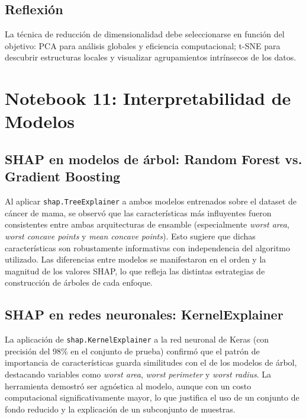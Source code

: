 \documentclass[12pt, a4paper]{article}
\begin{document}
\subsection{Reflexión}

La técnica de reducción de dimensionalidad debe seleccionarse en función del objetivo: PCA para análisis globales y eficiencia computacional; t-SNE para descubrir estructuras locales y visualizar agrupamientos intrínsecos de los datos.

\section{Notebook 11: Interpretabilidad de Modelos}

\subsection{SHAP en modelos de árbol: Random Forest vs. Gradient Boosting}

Al aplicar \texttt{shap.TreeExplainer} a ambos modelos entrenados sobre el dataset de cáncer de mama, se observó que las características más influyentes fueron consistentes entre ambas arquitecturas de ensamble (especialmente \textit{worst area}, \textit{worst concave points} y \textit{mean concave points}). Esto sugiere que dichas características son robustamente informativas con independencia del algoritmo utilizado. Las diferencias entre modelos se manifestaron en el orden y la magnitud de los valores SHAP, lo que refleja las distintas estrategias de construcción de árboles de cada enfoque.

\subsection{SHAP en redes neuronales: KernelExplainer}

La aplicación de \texttt{shap.KernelExplainer} a la red neuronal de Keras (con precisión del 98\% en el conjunto de prueba) confirmó que el patrón de importancia de características guarda similitudes con el de los modelos de árbol, destacando variables como \textit{worst area}, \textit{worst perimeter} y \textit{worst radius}. La herramienta demostró ser agnóstica al modelo, aunque con un costo computacional significativamente mayor, lo que justifica el uso de un conjunto de fondo reducido y la explicación de un subconjunto de muestras.
\end{document}
